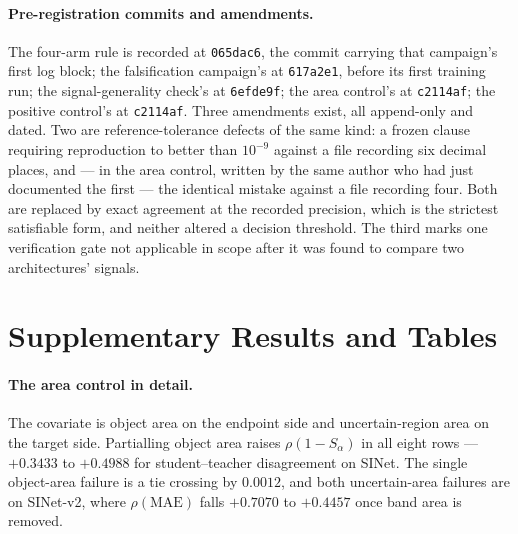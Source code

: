 \documentclass{article} %
\begin{document}
\paragraph{Pre-registration commits and amendments.} The four-arm rule is recorded at
\texttt{065dac6}, the commit carrying that campaign's first log block; the falsification campaign's at
\texttt{617a2e1}, before its first training run; the signal-generality check's at \texttt{6efde9f};
the area control's at \texttt{c2114af}; the positive control's at \texttt{c2114af}. Three amendments
exist, all append-only and dated. Two are reference-tolerance defects of the same kind: a frozen clause
requiring reproduction to better than $10^{-9}$ against a file recording six decimal places, and --- in
the area control, written by the same author who had just documented the first --- the identical
mistake against a file recording four. Both are replaced by exact agreement at the recorded precision,
which is the strictest satisfiable form, and neither altered a decision threshold. The third marks one
verification gate not applicable in scope after it was found to compare two architectures' signals.

\section{Supplementary Results and Tables}
\label{app:tables}

\paragraph{The area control in detail.} The covariate is object area on the endpoint side and
uncertain-region area on the target side. Partialling object area raises $\rho(1-S_\alpha)$ in all
eight rows --- $+0.3433$ to $+0.4988$ for student--teacher disagreement on SINet. The single
object-area failure is a tie crossing by $0.0012$, and both uncertain-area failures are on SINet-v2,
where $\rho(\mathrm{MAE})$ falls $+0.7070$ to $+0.4457$ once band area is removed.


\end{document}

